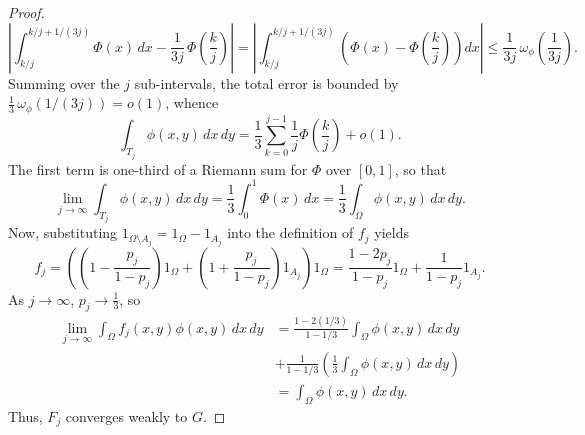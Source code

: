 \documentclass[12pt]{article}
\begin{document}
\begin{proof}
\begin{equation*}
    \left| \int_{k/j}^{k/j + 1/(3j)} \Phi(x)\,dx - \frac{1}{3j}\,\Phi\!\left(\frac{k}{j}\right) \right|
    = \left| \int_{k/j}^{k/j + 1/(3j)} \left( \Phi(x) - \Phi\!\left(\frac{k}{j}\right) \right) dx \right|
    \leq \frac{1}{3j}\,\omega_\phi\!\left(\frac{1}{3j}\right).
\end{equation*}
Summing over the $j$ sub-intervals, the total error is bounded by
$\frac{1}{3}\,\omega_\phi(1/(3j)) = o(1)$, whence
\begin{equation*}
    \int_{T_j} \phi(x,y) \, dx \, dy = \frac{1}{3} \sum_{k=0}^{j-1}\frac{1}{j}  \Phi\left(\frac{k}{j}\right) + o(1).
\end{equation*}
The first term is one-third of a Riemann sum for $\Phi$ over $[0,1]$, so that
\begin{equation*}
    \lim_{j \to \infty} \int_{T_j} \phi(x,y) \, dx \, dy = \frac{1}{3} \int_0^1 \Phi(x) \, dx = \frac{1}{3} \int_\Omega \phi(x,y) \, dx \, dy.
\end{equation*}
Now, substituting $1_{\Omega \setminus A_j} = 1_\Omega - 1_{A_j}$ into the definition of $f_j$
yields
\begin{equation*}
    f_j = \left( \left( 1 - \frac{p_j}{1-p_j} \right) 1_\Omega + \left( 1 + \frac{p_j}{1-p_j} \right) 1_{A_j} \right) 1_\Omega = \frac{1-2p_j}{1-p_j} 1_\Omega + \frac{1}{1-p_j} 1_{A_j}.
\end{equation*}
As $j \to \infty$, $p_j \to \frac{1}{3}$, so
\begin{align*}
    \lim_{j \to \infty} \int_\Omega f_j(x,y) \phi(x,y) \, dx \, dy &= \frac{1 - 2(1/3)}{1 - 1/3} \int_\Omega \phi(x,y) \, dx \, dy \\
    &+ \frac{1}{1 - 1/3} \left( \frac{1}{3} \int_\Omega \phi(x,y) \, dx \, dy \right) \\
    & = \int_\Omega \phi(x,y) \, dx \, dy.
\end{align*}
Thus, $F_j$ converges weakly to $G$.
\end{proof}
\end{document}
